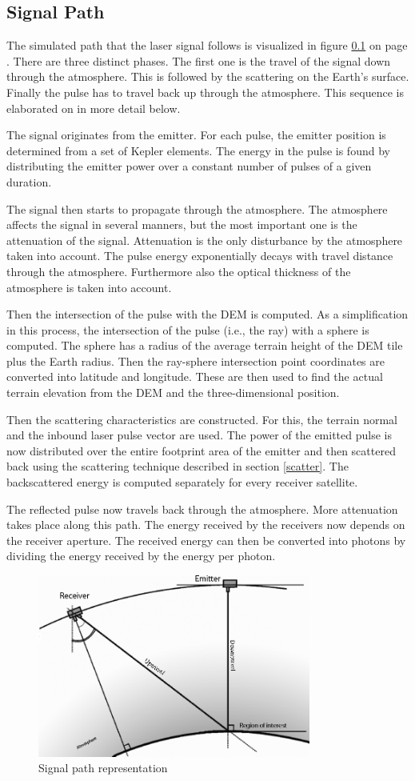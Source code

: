 \subsection{Signal Path}
\label{signPath}

The simulated path that the \ac{laser} signal follows is visualized in figure \ref{signPath} on 
page \pageref{signPath}. There are three distinct phases. The first one is the travel of the
signal down through the atmosphere. This is followed by the scattering on the Earth's surface. Finally the
pulse has to travel back up through the atmosphere. This sequence is elaborated on in more
detail below.

The signal originates from the emitter. For each pulse, the emitter position is determined from
a set of Kepler elements. The energy in the pulse is found by distributing the emitter power over a
constant number of pulses of a given duration.

The signal then starts to propagate through the atmosphere. The atmosphere affects the signal in
several manners, but the most important one is the attenuation of the signal. Attenuation is the
only disturbance by the atmosphere taken into account. The pulse energy exponentially decays with
travel distance through the atmosphere. Furthermore also the optical thickness of the atmosphere is taken into account.

Then the intersection of the pulse with the \ac{DEM} is computed. As a simplification in this
process, the intersection of the pulse (i.e., the ray) with a sphere is computed. The sphere has a radius of
the average terrain height of the \ac{DEM} tile plus the Earth radius. Then the ray-sphere
intersection point coordinates are converted into latitude and longitude. These are then used to 
find the actual terrain elevation from the \ac{DEM} and the three-dimensional position.

Then the scattering characteristics are constructed. For this, the terrain normal and the inbound
laser pulse vector are used. The power of the emitted pulse is now distributed over the entire
footprint area of the emitter and then scattered back using the scattering technique described in
section \ref{scatter}. The backscattered energy is computed separately for every receiver satellite.

The reflected pulse now travels back through the atmosphere. More attenuation takes
place along this path. The energy received by the receivers now depends on the receiver aperture. The received
energy can then be converted into photons by dividing the energy received by the energy per photon.

\begin{figure}[ht!]
\centering
\includegraphics[width=0.8\textwidth]{chapters/img/signalPath.png}
\caption{Signal path representation}
\label{fig:signalPath}
\end{figure}